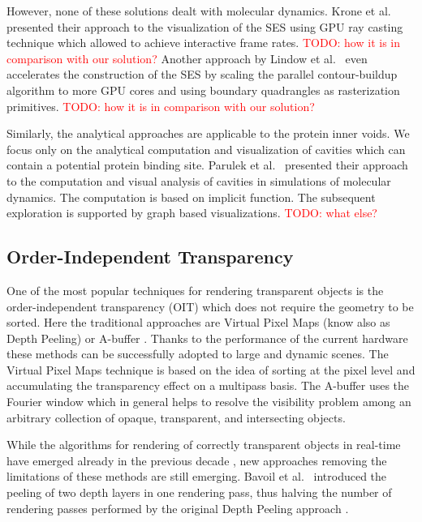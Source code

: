 However, none of these solutions dealt with molecular dynamics. 
Krone et al.~\cite{krone2009interactive} presented their approach to the visualization of the SES using GPU ray casting technique which allowed to achieve interactive frame rates. \textcolor{red}{TODO: how it is in comparison with our solution?} 
Another approach by Lindow et al.~\cite{lindow2010accelerated} even accelerates the construction of the SES by scaling the parallel contour-buildup algorithm to more GPU cores and using boundary quadrangles as rasterization primitives. \textcolor{red}{TODO: how it is in comparison with our solution?}

Similarly, the analytical approaches are applicable to the protein inner voids. 
We focus only on the analytical computation and visualization of cavities which can contain a potential protein binding site.
Parulek et al.~\cite{parulek2013visual} presented their approach to the computation and visual analysis of cavities in simulations of molecular dynamics.
The computation is based on implicit function. 
The subsequent exploration is supported by graph based visualizations.
\textcolor{red}{TODO: what else?}


\subsection{Order-Independent Transparency}
One of the most popular techniques for rendering transparent objects is the order-independent transparency (OIT) which does not require the geometry to be sorted.
Here the traditional approaches are Virtual Pixel Maps (know also as Depth Peeling) \cite{mammen1989transparency} or A-buffer \cite{carpenter1984abuffer}.
Thanks to the performance of the current hardware these methods can be successfully adopted to large and dynamic scenes.
The Virtual Pixel Maps technique is based on the idea of sorting at the pixel level and accumulating the transparency effect on a multipass basis. 
The A-buffer uses the Fourier window which in general helps to resolve the visibility problem among an arbitrary collection of opaque, transparent, and intersecting objects.

While the algorithms for rendering of correctly transparent objects in real-time have emerged already in the previous decade \cite{everitt2001interactive}, new approaches removing the limitations of these methods are still emerging.
Bavoil et al.~\cite{bavoil2008order} introduced the peeling of two depth layers in one rendering pass, thus halving the number of rendering passes performed by the original Depth Peeling approach \cite{everitt2001interactive}.

